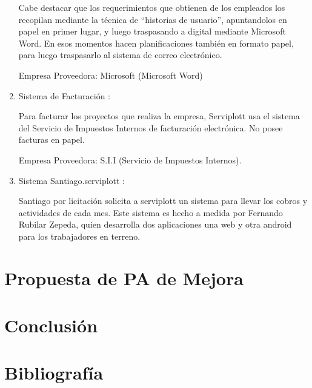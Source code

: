 \begin{enumerate}[1)]
Cabe destacar que los requerimientos que obtienen de los empleados los recopilan mediante la técnica de “historias de usuario”, apuntandolos en papel en primer lugar, y luego traspasando a digital mediante Microsoft Word. En esos momentos hacen planificaciones también en formato papel, para luego traspasarlo al sistema de correo electrónico.


Empresa Proveedora: Microsoft (Microsoft Word)

	\item Sistema de Facturación :

Para facturar los proyectos que realiza la empresa, Serviplott usa el sistema del Servicio de Impuestos Internos de facturación electrónica. No posee facturas en papel.

Empresa Proveedora: S.I.I (Servicio de Impuestos Internos).

	\item Sistema Santiago.serviplott :

Santiago por licitación solicita a serviplott un sistema para llevar los cobros y actividades de cada mes. Este sistema es hecho a medida por Fernando Rubilar Zepeda, quien desarrolla dos aplicaciones una web y otra android para los trabajadores en terreno.


	
	\end{enumerate}
		
\section{Propuesta de PA de Mejora}
\section{Conclusión}
\section{Bibliografía}

	

